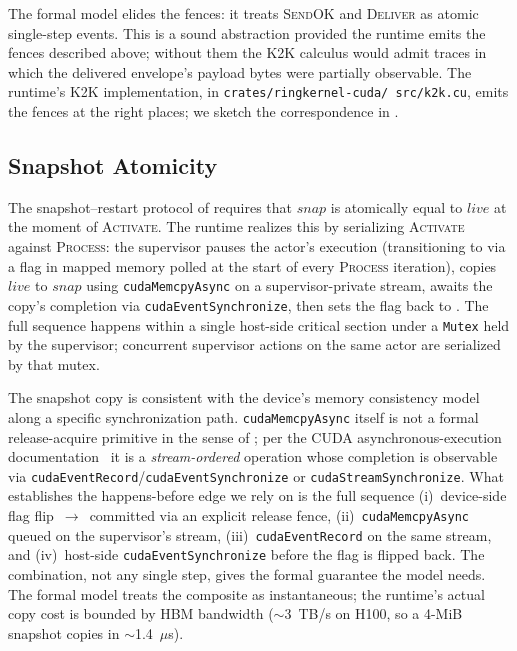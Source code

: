 The formal model elides the fences: it treats \textsc{SendOK} and
\textsc{Deliver} as atomic single-step events.  This is a sound
abstraction provided the runtime emits the fences described above;
without them the K2K calculus would admit traces in which the
delivered envelope's payload bytes were partially observable.  The
runtime's K2K implementation, in
\texttt{crates/\allowbreak ringkernel-\allowbreak cuda/\allowbreak
src/k2k.cu}, emits the fences at the right places; we sketch the
correspondence in .

\subsection{Snapshot Atomicity}
\label{sec:memory:snapshot}

The snapshot--restart protocol of 
requires that \(\mathit{snap}\) is atomically equal to
\(\mathit{live}\) at the moment of \textsc{Activate}.  The runtime
realizes this by serializing \textsc{Activate} against
\textsc{Process}: the supervisor pauses the actor's execution
(transitioning \Active{} to \Initializing{} via a flag in mapped
memory polled at the start of every \textsc{Process} iteration),
copies \(\mathit{live}\) to \(\mathit{snap}\) using
\texttt{cudaMemcpyAsync} on a supervisor-private stream, awaits
the copy's completion via \texttt{cudaEventSynchronize}, then sets
the flag back to \Active{}.  The full sequence happens within a
single host-side critical section under a \texttt{Mutex} held by
the supervisor; concurrent supervisor actions on the same actor are
serialized by that mutex.

The snapshot copy is consistent with the device's memory consistency
model along a specific synchronization path.  \texttt{cudaMemcpyAsync}
itself is not a formal release-acquire primitive in the sense of
; per the CUDA asynchronous-execution
documentation~\citep{nvidia2023cooperative} it is a
\emph{stream-ordered} operation whose completion is observable via
\texttt{cudaEventRecord}/\texttt{cudaEventSynchronize} or
\texttt{cudaStreamSynchronize}.  What establishes the happens-before
edge we rely on is the full sequence
(i)~device-side flag flip \Active{}\,\(\to\)\,\Initializing{}
committed via an explicit release fence,
(ii)~\texttt{cudaMemcpyAsync} queued on the supervisor's stream,
(iii)~\texttt{cudaEventRecord} on the same stream, and
(iv)~host-side \texttt{cudaEventSynchronize} before the flag is
flipped back.  The combination, not any single step, gives the
formal guarantee the model needs.  The formal model treats the
composite as instantaneous; the runtime's actual copy cost is
bounded by HBM bandwidth (\(\sim\)3~TB/s on H100, so a 4-MiB
snapshot copies in \(\sim\)1.4~$\mu$s).
